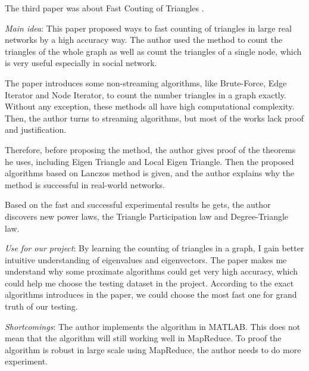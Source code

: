 The third paper was about Fast Couting of Triangles \cite{4781156}.
\begin{itemize*}
\item {\em Main idea}:
	   This paper proposed ways to fast counting of triangles in large real networks by a high accuracy way. The author used the method to count the triangles of the whole graph as well as count the triangles of a single node, which is very useful especially in social network.

	   The paper introduces some non-streaming algorithms, like Brute-Force, Edge Iterator and Node Iterator, to count the number triangles in a graph exactly. Without any exception, these methods all have high computational complexity. Then, the author turns to streaming algorithms, but most of the works lack proof and justification.

	   Therefore, before proposing the method, the author gives proof of the theorems he uses, including Eigen Triangle and Local Eigen Triangle. Then the proposed algorithms based on Lanczos method is given, and the author explains why the method is successful in real-world networks. 

	   Based on the fast and successful experimental results he gets, the author discovers new power laws, the Triangle Participation law and Degree-Triangle law. 
\item {\em Use for our project}:
	   By learning the counting of triangles in a graph, I gain better intuitive understanding of eigenvalues and eigenvectors. The paper makes me understand why some proximate algorithms could get very high accuracy, which could help me choose the testing dataset in the project. According to the exact algorithms introduces in the paper, we could choose the most fast one for grand truth of our testing.
\item {\em Shortcomings}:
       The author implements the algorithm in MATLAB. This does not mean that the algorithm will still working well in MapReduce. To proof the algorithm is robust in large scale using MapReduce, the author needs to do more experiment.
\end{itemize*}
